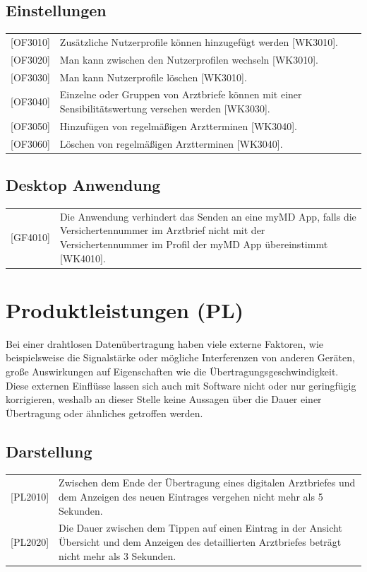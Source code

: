 \documentclass[a4paper]{scrreprt}
\begin{document}
\subsection{Einstellungen}
\begin{tabular}{lll}
[OF3010] &  \multicolumn{2}{p{12cm}}{Zusätzliche Nutzerprofile können hinzugefügt werden [WK3010].}\\
{[OF3020]} &  \multicolumn{2}{p{12cm}}{Man kann zwischen den Nutzerprofilen wechseln [WK3010].}\\
{[OF3030]} &  \multicolumn{2}{p{12cm}}{Man kann Nutzerprofile löschen [WK3010].}\\
{[OF3040]} &  \multicolumn{2}{p{12cm}}{Einzelne oder Gruppen von Arztbriefe können mit einer Sensibilitätswertung versehen werden [WK3030].}  \\
{[OF3050]} &  \multicolumn{2}{p{12cm}}{Hinzufügen von regelmäßigen Arztterminen [WK3040].}  \\
{[OF3060]} &  \multicolumn{2}{p{12cm}}{Löschen von regelmäßigen Arztterminen [WK3040].}  \\
\end{tabular}

\subsection{Desktop Anwendung}
\begin{tabular}{lll}
{[GF4010]}&  \multicolumn{2}{p{12cm}}{Die Anwendung verhindert das Senden an eine myMD \gls{App}, falls die Versichertennummer im Arztbrief nicht mit der Versichertennummer im Profil der myMD App übereinstimmt [WK4010].}\\
\end{tabular}


\section{Produktleistungen (PL)}
Bei einer drahtlosen Datenübertragung haben viele externe Faktoren, wie beispielsweise die Signalstärke oder mögliche Interferenzen von anderen Geräten, große Auswirkungen auf Eigenschaften wie die Übertragungsgeschwindigkeit. Diese externen Einflüsse lassen sich auch mit Software nicht oder nur geringfügig korrigieren, weshalb an dieser Stelle keine Aussagen über die Dauer einer Übertragung oder ähnliches getroffen werden.


\subsection{Darstellung}
\begin{tabular}{lll}
[PL2010]&  \multicolumn{2}{p{12cm}}{Zwischen dem Ende der Übertragung eines digitalen Arztbriefes und dem Anzeigen des neuen Eintrages vergehen nicht mehr als 5 Sekunden.}\\
{[PL2020]}&  \multicolumn{2}{p{12cm}}{Die Dauer zwischen dem Tippen auf einen Eintrag in der Ansicht Übersicht und dem Anzeigen des detaillierten Arztbriefes beträgt nicht mehr als 3 Sekunden.}\\

\end{tabular}
\end{document}
